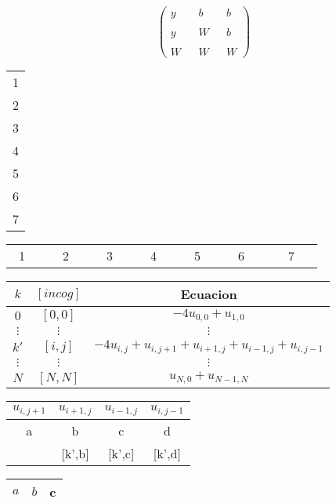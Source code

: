 \documentclass{article}
\begin{document}
\begin{equation}
\begin{pmatrix} 
y&&b&&b\\
&&&&\\
y&&W&&b\\
&&&&\\
W&&W&&W
\end{pmatrix}
\end{equation}

\begin{tabular}{c|}
1\\
2\\
3\\
4\\
5\\
6\\
7
\end{tabular}
\vspace{2cm}
\begin{tabular}{|c|c|c|c|c|c|c|}
\ 1\ \ & \ \ 2\ \ & \ \ 3\ \ & \ \ 4\ \ & \ \ 5\ \ & \ \ 6\ \ \ &\ \ 7 \ \
\end{tabular}

\begin{tabular}{|c|c|c|}\hline
 $k$ & $[incog]$ & Ecuacion \\ \hline
 $0$ & $[0,0]$ & $-4u_{0,0} + u_{1,0}$ \\ \hline
 $\vdots$ & $\vdots$ & $\vdots$ \\ \hline
 $k'$ & $[i,j]$& $-4u_{i,j} +  u_{i,j+1} + u_{i+1,j} + u_{i-1,j} + u_{i,j-1} $\\ \hline
 $\vdots$ & $\vdots$ & $\vdots$ \\ \hline
 $N$ & $[N,N]$ & $u_{N,0} + u_{N-1,N}$ \\ \hline
\end{tabular}

\hfill

\begin{tabular}{|c|c|c|c|}\hline
 $u_{i,j+1}$ & $u_{i+1,j}$ & $u_{i-1,j}$ & $u_{i,j-1}$\\ \hline
	a  & b & c & d \\ \hline
	[k',a] & [k',b] &  [k',c]  &  [k',d] \\\hline
\end{tabular}

\hfill

\begin{tabular}{|c|c|c|}
 $a$ & $b$ & c  \\ \hline
\end{tabular}
\end{document}
